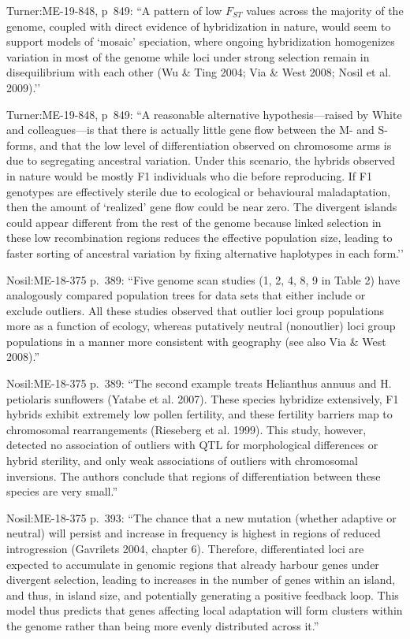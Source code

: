 \documentclass[11pt]{article}
\begin{document}
Turner:ME-19-848, p~849: ``A pattern of low $F_{ST}$ values across
the majority of the genome, coupled with direct evidence of
hybridization in nature, would seem to support models of `mosaic’
speciation, where ongoing hybridization homogenizes variation in
most of the genome while loci under strong selection remain in
disequilibrium with each other (Wu \& Ting 2004; Via \& West 2008;
Nosil et al. 2009).''

Turner:ME-19-848, p~849: ``A reasonable alternative hypothesis—raised
by White and colleagues—is that there is actually little gene flow
between the M- and S-forms, and that the low level of
differentiation observed on chromosome arms is due to segregating
ancestral variation. Under this scenario, the hybrids observed in
nature would be mostly F1 individuals who die before reproducing. If
F1 genotypes are effectively sterile due to ecological or
behavioural maladaptation, then the amount of `realized’ gene flow
could be near zero. The divergent islands could appear different
from the rest of the genome because linked selection in these low
recombination regions reduces the effective population size, leading
to faster sorting of ancestral variation by fixing alternative
haplotypes in each form.''

Nosil:ME-18-375 p.~389: ``Five genome scan studies (1, 2, 4, 8, 9 in
Table 2) have analogously compared population trees for data sets
that either include or exclude outliers. All these studies observed
that outlier loci group populations more as a function of ecology,
whereas putatively neutral (nonoutlier) loci group populations in a
manner more consistent with geography (see also Via \& West 2008).''

Nosil:ME-18-375 p.~389: ``The second example treats Helianthus annuus
and H. petiolaris sunflowers (Yatabe et al. 2007). These species
hybridize extensively, F1 hybrids exhibit extremely low pollen
fertility, and these fertility barriers map to chromosomal
rearrangements (Rieseberg et al. 1999). This study, however,
detected no association of outliers with QTL for morphological
differences or hybrid sterility, and only weak associations of
outliers with chromosomal inversions. The authors conclude that
regions of differentiation between these species are very small.''

Nosil:ME-18-375 p.~393: ``The chance that a new mutation (whether
adaptive or neutral) will persist and increase in frequency is
highest in regions of reduced introgression (Gavrilets 2004, chapter
6). Therefore, differentiated loci are expected to accumulate in
genomic regions that already harbour genes under divergent
selection, leading to increases in the number of genes within an
island, and thus, in island size, and potentially generating a
positive feedback loop. This model thus predicts that genes
affecting local adaptation will form clusters within the genome
rather than being more evenly distributed across it.''
\end{document}
